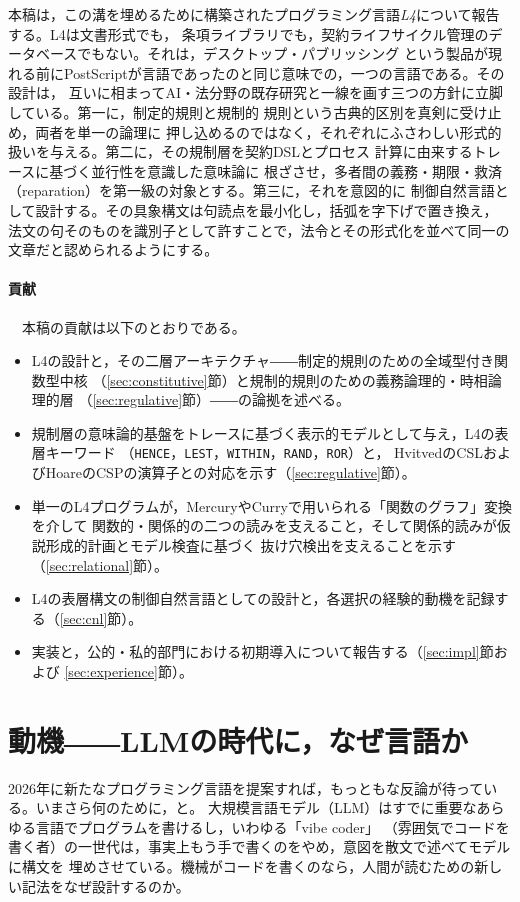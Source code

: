 \documentclass[11pt,a4paper]{ltjsarticle}
\newcommand{\code}[1]{\texttt{\small #1}}
\begin{document}
本稿は，この溝を埋めるために構築されたプログラミング言語\emph{L4}について報告する。L4は文書形式でも，
条項ライブラリでも，契約ライフサイクル管理のデータベースでもない。それは，デスクトップ・パブリッシング
という製品が現れる前にPostScriptが言語であったのと同じ意味での，一つの言語である。その設計は，
互いに相まってAI・法分野の既存研究と一線を画す三つの方針に立脚している。第一に，制定的規則と規制的
規則という古典的区別\cite{searle1969speech,hart1961concept}を真剣に受け止め，両者を単一の論理に
押し込めるのではなく，それぞれにふさわしい形式的扱いを与える。第二に，その規制層を契約DSLとプロセス
計算に由来するトレースに基づく並行性を意識した意味論\cite{hvitved2011thesis,hoare1978csp}に
根ざさせ，多者間の義務・期限・救済（reparation）を第一級の対象とする。第三に，それを意図的に
制御自然言語\cite{kuhn2014cnl}として設計する。その具象構文は句読点を最小化し，括弧を字下げで置き換え，
法文の句そのものを識別子として許すことで，法令とその形式化を並べて同一の文章だと認められるようにする。

\paragraph{貢献}　本稿の貢献は以下のとおりである。
\begin{itemize}
\item L4の設計と，その二層アーキテクチャ――制定的規則のための全域型付き関数型中核
  （\ref{sec:constitutive}節）と規制的規則のための義務論理的・時相論理的層
  （\ref{sec:regulative}節）――の論拠を述べる。
\item 規制層の意味論的基盤をトレースに基づく表示的モデルとして与え，L4の表層キーワード
  （\code{HENCE}，\code{LEST}，\code{WITHIN}，\code{RAND}，\code{ROR}）と，
  HvitvedのCSLおよびHoareのCSPの演算子との対応を示す（\ref{sec:regulative}節）。
\item 単一のL4プログラムが，MercuryやCurryで用いられる「関数のグラフ」変換を介して
  関数的・関係的の二つの読みを支えること，そして関係的読みが仮説形成的計画とモデル検査に基づく
  抜け穴検出を支えることを示す（\ref{sec:relational}節）。
\item L4の表層構文の制御自然言語としての設計と，各選択の経験的動機を記録する（\ref{sec:cnl}節）。
\item 実装と，公的・私的部門における初期導入について報告する（\ref{sec:impl}節および
  \ref{sec:experience}節）。
\end{itemize}

\section{動機――LLMの時代に，なぜ言語か}\label{sec:motivation}
2026年に新たなプログラミング言語を提案すれば，もっともな反論が待っている。いまさら何のために，と。
大規模言語モデル（LLM）はすでに重要なあらゆる言語でプログラムを書けるし，いわゆる「vibe coder」
（雰囲気でコードを書く者）の一世代は，事実上もう手で書くのをやめ，意図を散文で述べてモデルに構文を
埋めさせている。機械がコードを書くのなら，人間が読むための新しい記法をなぜ設計するのか。
\end{document}
